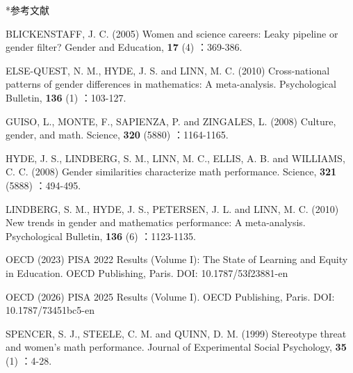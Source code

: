 \documentclass[a4paper,10pt,twocolumn]{ltjsarticle}
\makeatletter
\renewcommand{\section}{\@startsection{section}{1}{\z@}{1.1\Cvs \@plus.4\Cdp \@minus.2\Cdp}{.5\Cvs \@plus.2\Cdp}{\normalfont\gtfamily\bfseries\large}}
\makeatother
\begin{document}
\section*{参考文献}
\begingroup\scriptsize\raggedright{} 
\begin{list}{}{\setlength{\leftmargin}{1.5\zw}\setlength{\itemindent}{-1.5\zw}\setlength{\labelwidth}{0pt}\setlength{\labelsep}{0pt}\setlength{\itemsep}{1pt}\setlength{\parsep}{0pt}\setlength{\topsep}{0pt}\setlength{\listparindent}{0pt}}
\item BLICKENSTAFF, J. C. (2005) Women and science careers: Leaky pipeline or gender filter? Gender and Education, \textbf{17} (4) ：369-386.
\item ELSE-QUEST, N. M., HYDE, J. S. and LINN, M. C. (2010) Cross-national patterns of gender differences in mathematics: A meta-analysis. Psychological Bulletin, \textbf{136} (1) ：103-127.
\item GUISO, L., MONTE, F., SAPIENZA, P. and ZINGALES, L. (2008) Culture, gender, and math. Science, \textbf{320} (5880) ：1164-1165.
\item HYDE, J. S., LINDBERG, S. M., LINN, M. C., ELLIS, A. B. and WILLIAMS, C. C. (2008) Gender similarities characterize math performance. Science, \textbf{321} (5888) ：494-495.
\item LINDBERG, S. M., HYDE, J. S., PETERSEN, J. L. and LINN, M. C. (2010) New trends in gender and mathematics performance: A meta-analysis. Psychological Bulletin, \textbf{136} (6) ：1123-1135.
\item OECD (2023) PISA 2022 Results (Volume I): The State of Learning and Equity in Education. OECD Publishing, Paris. DOI: 10.1787/53f23881-en
\item OECD (2026) PISA 2025 Results (Volume I). OECD Publishing, Paris. DOI: 10.1787/73451bc5-en
\item SPENCER, S. J., STEELE, C. M. and QUINN, D. M. (1999) Stereotype threat and women's math performance. Journal of Experimental Social Psychology, \textbf{35} (1) ：4-28.
\end{list}\endgroup
\end{document}
